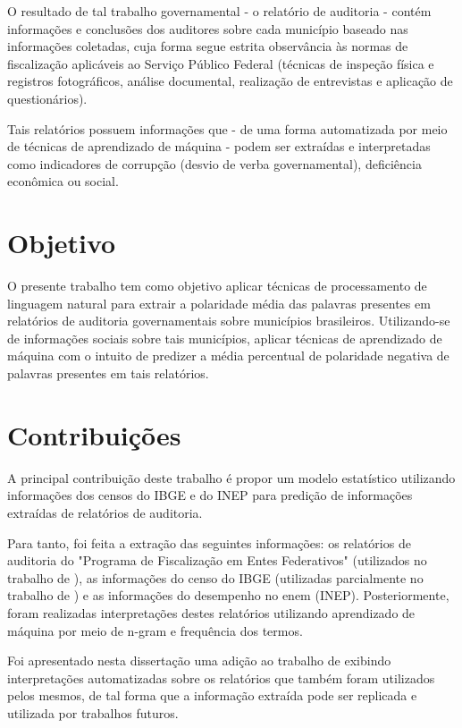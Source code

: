 O resultado de tal trabalho governamental - o relatório de auditoria - contém informações e conclusões dos auditores sobre cada município baseado nas informações coletadas, cuja forma segue estrita observância às normas de fiscalização aplicáveis ao Serviço Público Federal (técnicas de inspeção física e registros fotográficos, análise documental, realização de entrevistas e aplicação de questionários).

Tais relatórios possuem informações que - de uma forma automatizada por meio de técnicas de aprendizado de máquina - podem ser extraídas e interpretadas como indicadores de corrupção (desvio de verba governamental), deficiência econômica ou social.

\section{Objetivo}
\label{sec:objetivo}

O presente trabalho tem como objetivo aplicar técnicas de processamento de linguagem natural para extrair a polaridade média das palavras presentes em relatórios de auditoria governamentais sobre municípios brasileiros. Utilizando-se de informações sociais sobre tais municípios, aplicar técnicas de aprendizado de máquina com o intuito de predizer a média percentual de polaridade negativa de palavras presentes em tais relatórios.

\section{Contribuições}
\label{sec:contribuicoes}

A principal contribuição deste trabalho é propor um modelo estatístico utilizando informações dos censos do IBGE e do INEP para predição de informações extraídas de relatórios de auditoria.

Para tanto, foi feita a extração das seguintes informações: os relatórios de auditoria do "Programa de Fiscalização em Entes Federativos" (utilizados no trabalho de \citet{FerrazFinan2008}), as informações do censo do IBGE (utilizadas parcialmente no trabalho de \citet{Goldani2001}) e as informações do desempenho no enem (INEP). Posteriormente, foram realizadas interpretações destes relatórios utilizando aprendizado de máquina por meio de n-gram e frequência dos termos.

Foi apresentado nesta dissertação uma adição ao trabalho de \citet{FerrazFinan2008} exibindo interpretações automatizadas sobre os relatórios que também foram utilizados pelos mesmos, de tal forma que a informação extraída pode ser replicada e utilizada por trabalhos futuros.

